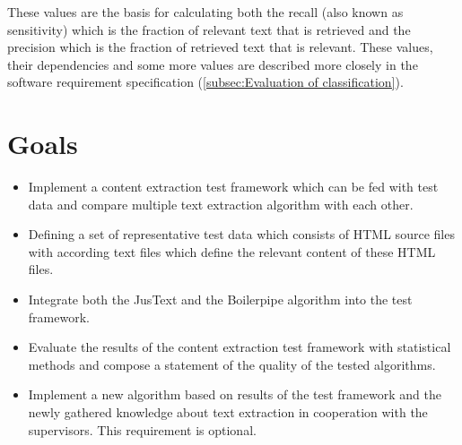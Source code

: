 These values are the basis for calculating  both the recall (also known as sensitivity) which is the fraction of relevant text that is retrieved and the precision which is the fraction of retrieved text that is relevant. These values, their dependencies and some more values are described more closely in the software requirement specification (\ref{subsec:Evaluation of classification}).

\section{Goals}

\begin{itemize}
\item Implement a content extraction test framework which can be fed with test data and compare multiple text extraction algorithm with each other.
\item Defining a set of representative test data which consists of HTML source files with according text files which define the relevant content of these HTML files.
\item Integrate both the JusText and the Boilerpipe algorithm into the test framework.
\item Evaluate the results of the content extraction test framework with statistical methods and compose a statement of the quality of the tested algorithms.
\item Implement a new algorithm based on results of the test framework and the newly gathered knowledge about text extraction in cooperation with the supervisors. This requirement is optional.
\end{itemize}